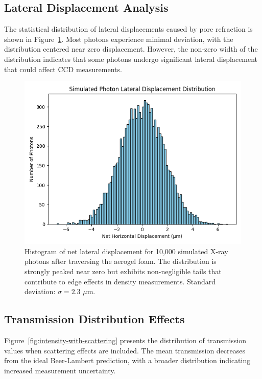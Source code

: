 \documentclass[twocolumn]{aastex701}
\begin{document}
\subsection{Lateral Displacement Analysis}

The statistical distribution of lateral displacements caused by pore refraction is shown in Figure~\ref{fig:lateral-displacement}. Most photons experience minimal deviation, with the distribution centered near zero displacement. However, the non-zero width of the distribution indicates that some photons undergo significant lateral displacement that could affect CCD measurements.

\begin{figure}[htbp]
  \centering
  \includegraphics[width=\linewidth]{lateral_displacement.png}
  \caption{Histogram of net lateral displacement for 10,000 simulated X-ray photons after traversing the aerogel foam. The distribution is strongly peaked near zero but exhibits non-negligible tails that contribute to edge effects in density measurements. Standard deviation: $\sigma = 2.3$ $\mu$m.}
  \label{fig:lateral-displacement}
\end{figure}

\subsection{Transmission Distribution Effects}

Figure~\ref{fig:intensity-with-scattering} presents the distribution of transmission values when scattering effects are included. The mean transmission decreases from the ideal Beer-Lambert prediction, with a broader distribution indicating increased measurement uncertainty.
\end{document}
